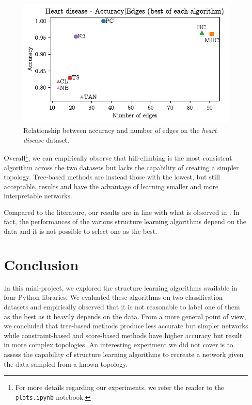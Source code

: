 \documentclass[letterpaper]{article}
\begin{document}
\begin{figure}[h]
    \centering
    \includegraphics[width=\linewidth]{img/heart_acc_edges.pdf}
    \caption{Relationship between accuracy and number of edges on the \textit{heart disease} dataset.}
    \label{img:heart}
\end{figure}

Overall\footnote{For more details regarding our experiments, we refer the reader to the \texttt{plots.ipynb} notebook.}, 
we can empirically observe that hill-climbing is the most consistent algorithm
across the two datasets but lacks the capability of creating a simpler topology.
Tree-based methods are instead those with the lowest, but still acceptable, results and 
have the advantage of learning smaller and more interpretable networks.

Compared to the literature, our results are in line with what is observed in \cite{learning_comparison_2021}.
In fact, the performances of the various structure learning algorithms depend on the data and 
it is not possible to select one as the best.






\section{Conclusion}

In this mini-project, we explored the structure learning algorithms available in four Python libraries.
We evaluated these algorithms on two classification datasets and 
empirically observed that it is not reasonable to label one of them as the best as it heavily depends on the data.
From a more general point of view, we concluded that tree-based methods produce less accurate but simpler networks
while constraint-based and score-based methods have higher accuracy but result in more complex topologies.
An interesting experiment we did not cover is to assess the capability of structure learning algorithms to recreate
a network given the data sampled from a known topology.
\end{document}
